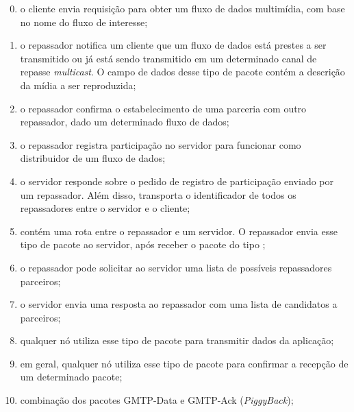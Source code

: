 \begin{enumerate}
	\setcounter{enumi}{-1}
	
	\item {} o cliente envia requisição para obter um fluxo de dados multimídia, com base no nome do fluxo de interesse;
	
	\item {} o repassador notifica um cliente que um fluxo de dados está prestes a ser transmitido ou já está sendo transmitido em um determinado canal de repasse \textit{multicast}. O campo de dados desse tipo de pacote contém a descrição da mídia a ser reproduzida;
	
	\item {} o repassador confirma o estabelecimento de uma parceria com outro repassador, dado um determinado fluxo de dados;
	
	\item {} o repassador registra participação no servidor para funcionar como distribuidor de um fluxo de dados;
	
	\item {} o servidor responde sobre o pedido de registro de participação enviado por um repassador. Além disso, transporta o identificador de todos os repassadores entre o servidor e o cliente;
	
	\item {} contém uma rota entre o repassador e um servidor. O repassador envia esse tipo de pacote ao servidor, após receber o pacote do tipo ;
	
	\item {} o repassador pode solicitar ao servidor uma lista de possíveis repassadores parceiros;
	
	\item {} o servidor envia uma resposta ao repassador com uma lista de candidatos a parceiros;
	
	\item {} qualquer nó utiliza esse tipo de pacote para transmitir dados da aplicação;
	
	\item {} em geral, qualquer nó utiliza esse tipo de pacote para confirmar a recepção de um determinado pacote;
	
	\item {} combinação dos pacotes GMTP-Data e GMTP-Ack (\textit{PiggyBack});
	

\end{enumerate}
